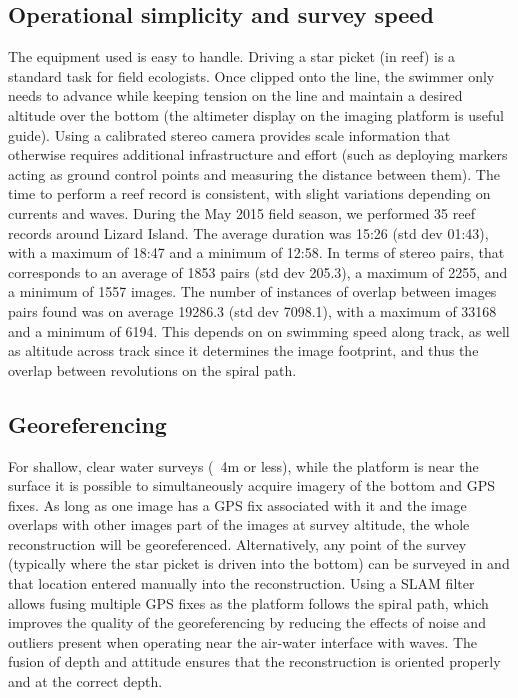 \subsection{Operational simplicity and survey speed}
The equipment used is easy to handle. Driving a star picket (in reef) is a standard task for field ecologists. Once clipped onto the line, the swimmer only needs to advance while keeping tension on the line and maintain a desired altitude over the bottom (the altimeter display on the imaging platform is useful guide).
Using a calibrated stereo camera provides scale information that otherwise requires additional infrastructure and effort (such as deploying markers acting as ground control points and measuring the distance between them). 
The time to perform a reef record is consistent, with slight variations depending on currents and waves. During the May 2015 field season, we performed 35 reef records around Lizard Island. The average duration was 15:26 (std dev 01:43), with a maximum of 18:47 and a minimum of 12:58. In terms of stereo pairs, that corresponds to an average of 1853 pairs (std dev 205.3), a maximum of 2255, and a minimum of 1557 images. The number of instances of overlap between images pairs found was on average 19286.3 (std dev 7098.1), with a maximum of 33168 and a minimum of 6194. This depends on on swimming speed along track, as well as altitude across track since it determines the image footprint, and thus the overlap between revolutions on the spiral path.


\subsection{Georeferencing}
For shallow, clear water surveys (~4m or less), while the platform is near the surface it is possible to simultaneously acquire imagery of the bottom and GPS fixes. As long as one image has a GPS fix associated with it and the image overlaps with other images part of the images at survey altitude, the whole reconstruction will be georeferenced. Alternatively, any point of the survey (typically where the star picket is driven into the bottom) can be surveyed in and that location entered manually into the reconstruction. Using a SLAM filter allows fusing multiple GPS fixes as the platform follows the spiral path, which improves the quality of the georeferencing by reducing the effects of noise and outliers present when operating near the air-water interface with waves.
The fusion of depth and attitude ensures that the reconstruction is oriented properly and at the correct depth.

